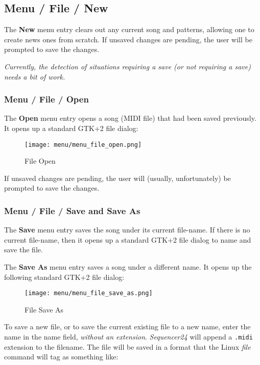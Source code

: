 \subsection{Menu / File / New}
\label{subsec:menu_file_new}

   The \textbf{New} menu entry clears out any current song and patterns,
   allowing one to create news ones from scratch.
   If unsaved changes are pending, the user will be prompted to save the
   changes.

   \textsl{Currently, the detection of situations requiring a save (or not
   requiring a save) needs a bit of work.}

\subsubsection{Menu / File / Open}
\label{subsubsec:seq24_menu_file_open}

   The \textbf{Open} menu entry opens a song (MIDI file)
   that had been saved previously.  It opens up a standard GTK+2 file dialog:

\begin{figure}[H]
   \centering 
   \texttt{[image: menu/menu\_file\_open.png]}
   \caption{File Open}
   \label{fig:seq24_menu_file_open}
\end{figure}

   If unsaved changes are pending, the user will (usually, unfortunately)
   be prompted to save the changes.

\subsubsection{Menu / File / Save and Save As}
\label{subsubsec:menu_file_open_save_as}

   The \textbf{Save} menu entry saves the song under its current file-name.
   If there is no current file-name, then it opens up a standard GTK+2 file
   dialog to name and save the file.

   The \textbf{Save As} menu entry saves a song under a different name.
   It opens up the following standard GTK+2 file dialog:

\begin{figure}[H]
   \centering 
   \texttt{[image: menu/menu\_file\_save\_as.png]}
   \caption{File Save As}
   \label{fig:seq24_menu_file_save_as}
\end{figure}

   To save a new file, or to save the current existing file to a new name,
   enter the name in the name field, \textsl{without an extension}.
   \textsl{Sequencer24} will append a \texttt{.midi} extension to the filename.
   The file will be saved in a format that the Linux \textsl{file} command
   will tag as something like:

